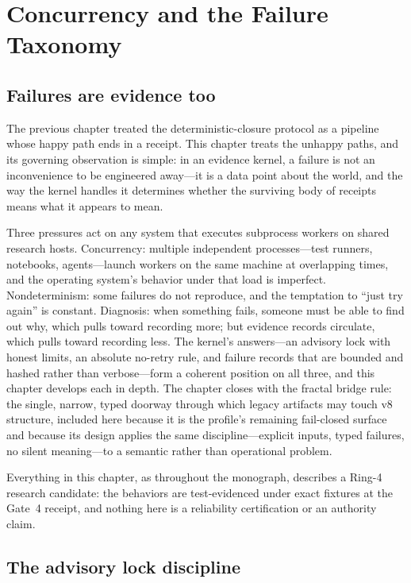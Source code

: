 \chapter{Concurrency and the Failure Taxonomy}\label{ch08:concurrency}

\section{Failures are evidence too}\label{ch08:intro}

The previous chapter treated the deterministic-closure protocol as a pipeline whose happy path ends in a receipt. This chapter treats the unhappy paths, and its governing observation is simple: in an evidence kernel, a failure is not an inconvenience to be engineered away---it is a data point about the world, and the way the kernel handles it determines whether the surviving body of receipts means what it appears to mean.

Three pressures act on any system that executes subprocess workers on shared research hosts. Concurrency: multiple independent processes---test runners, notebooks, agents---launch workers on the same machine at overlapping times, and the operating system's behavior under that load is imperfect. Nondeterminism: some failures do not reproduce, and the temptation to ``just try again'' is constant. Diagnosis: when something fails, someone must be able to find out why, which pulls toward recording more; but evidence records circulate, which pulls toward recording less. The kernel's answers---an advisory lock with honest limits, an absolute no-retry rule, and failure records that are bounded and hashed rather than verbose---form a coherent position on all three, and this chapter develops each in depth. The chapter closes with the fractal bridge rule: the single, narrow, typed doorway through which legacy artifacts may touch v8 structure, included here because it is the profile's remaining fail-closed surface and because its design applies the same discipline---explicit inputs, typed failures, no silent meaning---to a semantic rather than operational problem.

Everything in this chapter, as throughout the monograph, describes a Ring-4 research candidate: the behaviors are test-evidenced under exact fixtures at the Gate~4 receipt, and nothing here is a reliability certification or an authority claim.

\section{The advisory lock discipline}\label{ch08:lock}


